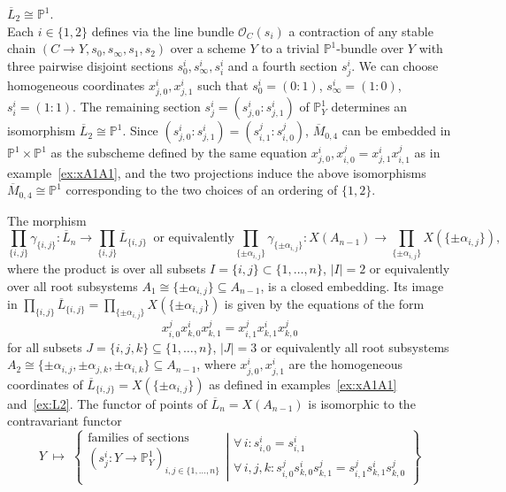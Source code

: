 \documentclass[ALCO,ThmDefs,Unicode,epreuves]{cedram}
\def\P{\mathds P}
\def\O{\mathcal O}
\begin{document}
\begin{exam}\label{ex:L2} $\overline{L}_2\cong\P^1$.\\
Each $i\in\{1,2\}$ defines via the line bundle $\O_C(s_i)$ a contraction of 
any stable %
{} chain $(C\to Y,s_0,s_\infty,s_1,s_2)$ over a scheme $Y$ 
to a trivial $\P^1$-bundle over $Y$ with three pairwise disjoint sections 
$s^i_0,s^i_\infty,s^i_i$ and a fourth section $s^i_j$.
We can choose homogeneous coordinates $x^i_{j,0},x^i_{j,1}$ such that 
$s^i_0=(0:1)$, $s^i_\infty=(1:0)$, $s^i_i=(1:1)$.
The remaining section $s^i_j=(s^i_{j,0}:s^i_{j,1})$ of $\P^1_Y$ determines an 
isomorphism $\overline{L}_2\cong\P^1$.
Since $(s^i_{j,0}:s^i_{j,1})=(s^j_{i,1}:s^j_{i,0})$, $\overline{M}_{0,4}$ can be 
embedded in $\P^1\times\P^1$ as the subscheme defined by the same equation 
$x^i_{j,0},x^j_{i,0}=x^i_{j,1}x^j_{i,1}$ as in example~\ref{ex:xA1A1}, and the 
two projections induce the above isomorphisms $\overline{M}_{0,4}\cong\P^1$ 
corresponding to the two choices of an ordering of $\{1,2\}$.
\end{exam}

\begin{theo}[\cite{BB11}]\label{thm:Ln-ProdP1-functor} 
The morphism
\[
\prod\limits_{\{i,j\}}\!\!\gamma_{\{i,j\}}\colon\overline{L}_n\!\to\!
\prod\limits_{\{i,j\}}\!\overline{L}_{\{i,j\}}
\;\:\text{or equivalently}
\prod\limits_{\{\pm\alpha_{i,j}\}}\!\!\!\!\!\gamma_{\{\pm\alpha_{i,j}\}}\colon
X(A_{n-1})\!\to\!\!\!\!\!
\prod\limits_{\{\pm\alpha_{i,j}\}}\!\!\!\!\!X(\{\pm\alpha_{i,j}\}),
\]
where the product is over all subsets $I=\{i,j\}\subset\{1,\ldots,n\}$,
$|I|=2$ or equivalently over all root subsystems 
$A_1\cong\{\pm\alpha_{i,j}\}\subseteq A_{n-1}$, is a closed embedding. 
Its image in $\prod_{\{i,j\}}\overline{L}_{\{i,j\}}
=\prod_{\{\pm\alpha_{i,j}\}}X({\{\pm\alpha_{i,j}\}})$ 
is given by the equations of the form
\[
x^j_{i,0}x^i_{k,0}x^j_{k,1}=x^j_{i,1}x^i_{k,1}x^j_{k,0}
\]
for all subsets $J=\{i,j,k\}\subseteq\{1,\ldots,n\}$, $|J|=3$
or equivalently all root subsystems
$A_2\cong\{\pm\alpha_{i,j},\pm\alpha_{j,k},\pm\alpha_{i,k}\}\subseteq A_{n-1}$,
where $x^i_{j,0},x^i_{j,1}$ are the homogeneous coordinates of 
$\overline{L}_{\{i,j\}}=X(\{\pm\alpha_{i,j}\})$ as defined in examples~\ref{ex:xA1A1}
and~\ref{ex:L2}. The functor of points of $\overline{L}_n=X(A_{n-1})$ is isomorphic 
to the contravariant functor
\begin{equation}\label{eq:Ln-functor} 
\textstyle
Y\;\mapsto\;
\left\{
\begin{array}{l}
\text{families of sections}\\
(s^i_j\colon Y\to\P^1_Y)_{i,j\in\{1,\ldots,n\}}\\
\end{array}
\left|
\begin{array}{l}
\forall\,i\colon s^i_{i,0}=s^i_{i,1}\\
\forall\,i,j,k\colon s^j_{i,0}s^i_{k,0}s^j_{k,1}=s^j_{i,1}s^i_{k,1}s^j_{k,0}
\end{array}
\right.\right\}
\end{equation}
\end{theo}
\end{document}
